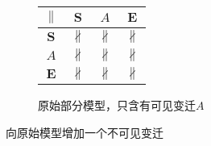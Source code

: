 \begin{figure}[htbp]
\begin{subfigure}{1\textwidth}
\begin{minipage}[b]{0.3\textwidth}
      \centering
      \begin{tabular}{|c|c|c|c|} \hline
        $\parallel$ & $\bm{S}$ & $A$ & $\bm{E}$\\ \hline
        $\bm{S}$ & $\nparallel$ & $\nparallel$ & $\nparallel$\\ \hline
        $A$ & $\nparallel$ & $\nparallel$ & $\nparallel$\\ \hline
        $\bm{E}$ & $\nparallel$ & $\nparallel$ & $\nparallel$\\ \hline
      \end{tabular}
    \end{minipage}
    \caption{原始部分模型，只含有可见变迁$A$}
    \label{fig:uniqueness_3_a}
  \end{subfigure}
  \vspace{6pt}
  \caption{向原始模型增加一个不可见变迁}
\end{figure}

